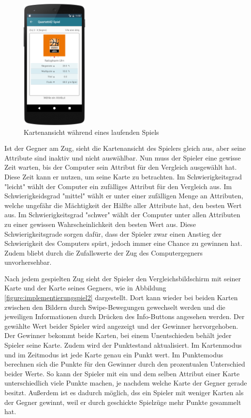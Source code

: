 \begin{figure}[htp]
	\centering
  	\includegraphics[width=0.3\textwidth]{img/screenshots/device_select_attr.png}
	\caption{Kartenansicht während eines laufenden Spiels}
	\label{figure:implementierungspiel1}
\end{figure}

Ist der Gegner am Zug, sieht die Kartenansicht des Spielers gleich aus, aber seine Attribute sind inaktiv und nicht auswählbar. Nun muss der Spieler eine gewisse Zeit warten, bis der Computer sein Attribut für den Vergleich ausgewählt hat. Diese Zeit kann er nutzen, um seine Karte zu betrachten. Im Schwierigkeitsgrad "leicht" wählt der Computer ein zufälliges Attribut für den Vergleich aus. Im Schwierigkeidsgrad "mittel" wählt er unter einer zufälligen Menge an Attributen, welche ungefähr die Mächtigkeit der Hälfte aller Attribute hat, den besten Wert aus. Im Schwierigkeitsgrad "schwer" wählt der Computer unter allen Attributen zu einer gewissen Wahrscheinlichkeit den besten Wert aus. Diese Schwierigkeitsgrade sorgen dafür, dass der Spieler zwar einen Anstieg der Schwierigkeit des Computers spürt, jedoch immer eine Chance zu gewinnen hat. Zudem bliebt durch die Zufallswerte der Zug des Computergegners unvorhersehbar.

Nach jedem gespielten Zug sieht der Spieler den Vergleichsbildschirm mit seiner Karte und der Karte seines Gegners, wie in Abbildung \ref{figure:implementierungspiel2}  dargestellt. Dort kann wieder bei beiden Karten zwischen den Bildern durch Swipe-Bewegungen gewechselt werden und die jeweiligen Informationen durch Drücken des Info-Buttons angesehen werden. Der gewählte Wert beider Spieler wird angezeigt und der Gewinner hervorgehoben. Der Gewinner bekommt beide Karten, bei einem Unentschieden behält jeder Spieler seine Karte. Zudem wird der Punktestand aktualisiert. Im Kartenmodus und im Zeitmodus ist jede Karte genau ein Punkt wert. Im Punktemodus berechnen sich die Punkte für den Gewinner durch den prozentualen Unterschied beider Werte. So kann der Spieler mit ein und dem selben Attribut einer Karte unterschiedlich viele Punkte machen, je nachdem welche Karte der Gegner gerade besitzt. Außerdem ist es dadurch möglich, dss ein Spieler mit weniger Karten als der Gegner gewinnt, weil er durch geschickte Spielzüge mehr Punkte gesammelt hat.

